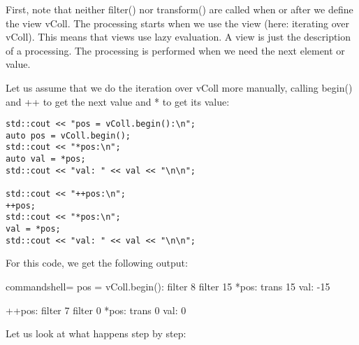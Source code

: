 First, note that neither filter() nor transform() are called when or after we define the view vColl. The processing starts when we use the view (here: iterating over vColl). This means that views use lazy evaluation. A view is just the description of a processing. The processing is performed when we need the next element or value.

Let us assume that we do the iteration over vColl more manually, calling begin() and ++ to get the next value and * to get its value:

\begin{lstlisting}[style=styleCXX]
std::cout << "pos = vColl.begin():\n";
auto pos = vColl.begin();
std::cout << "*pos:\n";
auto val = *pos;
std::cout << "val: " << val << "\n\n";

std::cout << "++pos:\n";
++pos;
std::cout << "*pos:\n";
val = *pos;
std::cout << "val: " << val << "\n\n";
\end{lstlisting}

For this code, we get the following output:

{\footnotesize
\begin{tcblisting}{commandshell={}}
pos = vColl.begin():
filter 8
filter 15
*pos:
trans 15
val: -15

++pos:
filter 7
filter 0
*pos:
trans 0
val: 0
\end{tcblisting}
}

Let us look at what happens step by step:

